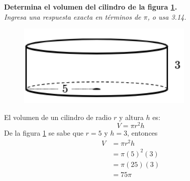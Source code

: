 \textbf{Determina el volumen del cilindro de la figura \ref{fig:vol_cil_11}.}\\
\textit{Ingresa una respuesta exacta en términos de $\pi$, o usa 3.14.}\\

\begin{minipage}[t]{0.3\linewidth}
    \begin{figure}[H]
        \centering
        \includegraphics[width=0.75\textwidth]{../images/vol_cil_11.png}
        \caption{}
        \label{fig:vol_cil_11}
    \end{figure}
\end{minipage}%
\begin{minipage}[t]{0.7\linewidth}
    \begin{solutionbox}{5cm}        El volumen de un cilindro de radio $r$ y altura $h$ es:
        \begin{equation*}
            V = \pi r^2 h
        \end{equation*}
        De la figura \ref{fig:vol_cil_11} se sabe que $r=5$ y $h=3$, entonces
        \begin{equation*}
            \begin{split}
                V & = \pi r^2 h\\
                & = \pi (5)^2 (3)\\
                & = \pi (25) (3)\\
                & = 75\pi
            \end{split}
        \end{equation*}
    \end{solutionbox}
\end{minipage}%